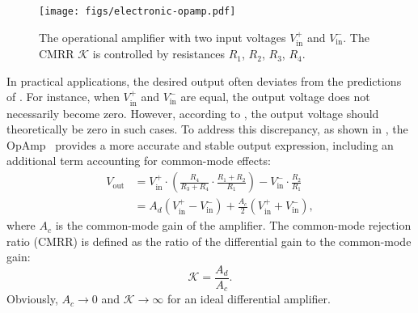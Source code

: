 \begin{figure}[!tb]
    \centering
    \texttt{[image: figs/electronic-opamp.pdf]} 
    \caption{The operational amplifier with two input voltages $V_{\text{in}}^{+}$ and $V_{\text{in}}^{-}$. 
    The CMRR $\mathcal{K}$ is controlled by resistances $R_1$, $R_2$, $R_3$, $R_4$.
    } 
    \label{fig:electronic-opamp}
\end{figure}

In practical applications, the desired output often deviates from the predictions of .
For instance, when $V_{\text{in}}^{+}$ and $V_{\text{in}}^{-}$ are equal, the output voltage does not necessarily become zero.
However, according to , the output voltage should theoretically be zero in such cases. 
To address this discrepancy, as shown in , the OpAmp~\cite{sansen2007analog} provides a more accurate and stable output expression, including an additional term accounting for common-mode effects:
\begin{align}  
    V_{\text{out}} &= V_{\text{in}}^{+}\cdot(\frac{R_4}{R_3+R_4}\cdot\frac{R_1 + R_2}{R_1}) - V_{\text{in}}^{-}\cdot\frac{R_2}{R_1} \nonumber\\
    &= A_{d}(V_{\text{in}}^{+} - V_{\text{in}}^{-}) + \frac{A_{c}}{2}(V_{\text{in}}^{+} + V_{\text{in}}^{-}),
\label{eq:opampamp}  
\end{align}  
where $A_{c}$ is the common-mode gain of the amplifier. 
The common-mode rejection ratio (CMRR) is defined as the ratio of the differential gain to the common-mode gain:
\begin{equation}
    \mathcal{K} = \frac{A_{d}}{A_{c}}.
\label{eq:cmrr}
\end{equation}
Obviously, $A_{c} \rightarrow 0$ and $\mathcal{K} \rightarrow \infty$ for an ideal differential amplifier. 

